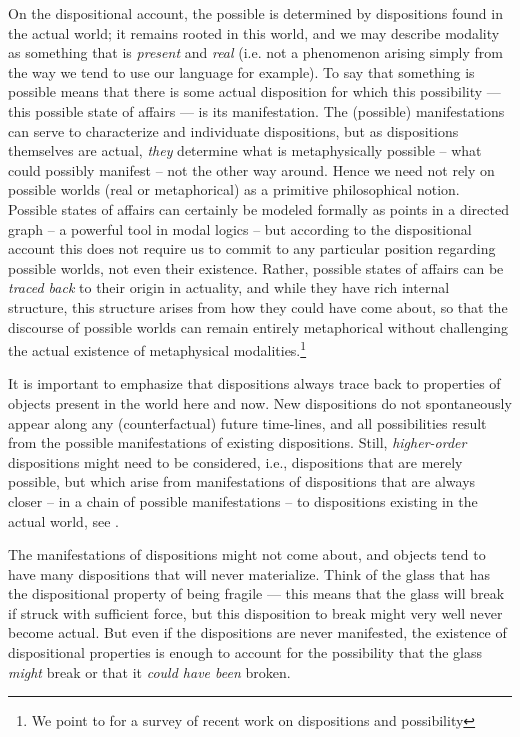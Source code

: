 \documentclass{article}
\begin{document}
On the dispositional account, the possible is determined by dispositions found in the actual world; it remains rooted in this world, and we may describe modality as something that is \emph{present} and \emph{real} (i.e. not a phenomenon arising simply from the way we tend to use our language for example). To say that something is possible means that there is some actual disposition for which this possibility --- this possible state of affairs --- is its manifestation. The (possible) manifestations can serve to characterize and individuate dispositions, but as dispositions themselves are actual, \emph{they} determine what is metaphysically possible -- what could possibly manifest -- not the other way around. Hence we need not rely on possible worlds (real or metaphorical) as a primitive philosophical notion. Possible states of affairs can certainly be modeled formally as points in a directed graph -- a powerful tool in modal logics -- but according to the dispositional account this does not require us to commit to any particular position regarding possible worlds, not even their existence. Rather, possible states of affairs can be \emph{traced back} to their origin in actuality, and while they have rich internal structure, this structure arises from how they could have come about, so that the discourse of possible worlds can remain entirely metaphorical without challenging the actual existence of metaphysical modalities.\footnote{We point to \cite{MwPw} for a survey of recent work on dispositions and possibility}

It is important to emphasize that dispositions always trace back to properties of objects present in the world here and now. New dispositions do not spontaneously appear along any (counterfactual) future time-lines, and all possibilities result from the possible manifestations of existing dispositions. Still, \emph{higher-order} dispositions might need to be considered, i.e., dispositions that are merely possible, but which arise from manifestations of dispositions that are always closer -- in a chain of possible manifestations -- to dispositions existing in the actual world, see \cite{dispmod}.

The manifestations of dispositions might not come about, and objects tend to have many dispositions that will never materialize. Think of the glass that has the dispositional property of being fragile --- this means that the glass will break if struck with sufficient force, but this disposition to break might very well never become actual. But even if the dispositions are never manifested, the existence of dispositional properties is enough to account for the possibility that the glass \emph{might} break or that it \emph{could have been} broken.
\end{document}
